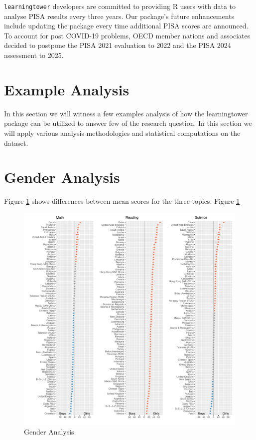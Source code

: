 \texttt{learningtower} developers are committed to providing R users
with data to analyse PISA results every three years. Our package's
future enhancements include updating the package every time additional
PISA scores are announced. To account for post COVID-19 problems, OECD
member nations and associates decided to postpone the PISA 2021
evaluation to 2022 and the PISA 2024 assessment to 2025.

\hypertarget{example-analysis}{%
\section{Example Analysis}\label{example-analysis}}

In this section we will witness a few examples analysis of how the
learningtower package can be utilized to answer few of the research
question. In this section we will apply various analysis methodologies
and statistical computations on the dataset.

\hypertarget{gender-analysis}{%
\section{Gender Analysis}\label{gender-analysis}}

Figure \ref{fig:score-differences} shows differences between mean scores
for the three topics. Figure \ref{fig:score-differences}

\begin{Schunk}
\begin{figure}
\includegraphics[width=1\linewidth]{learningtower_files/figure-latex/score-differences-1} \caption[Gender Analysis]{Gender Analysis}\label{fig:score-differences}
\end{figure}
\end{Schunk}

